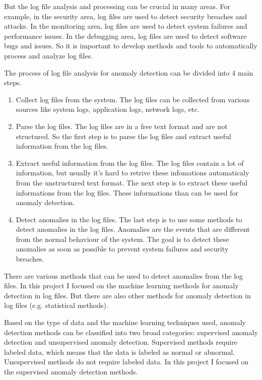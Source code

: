 But the log file analysis and processing can be crucial in many areas. For example, in the security area, log files are used to detect security breaches and attacks. 
In the monitoring area, log files are used to detect system failures and performance issues. In the debugging area, log files are used to detect software bugs and issues. %
So it is important to develop methods and tools to automatically process and analyze log files. 

The process of log file analysis for anomaly detection can be divided into 4 main steps.
\begin{enumerate}
    \item Collect log files from the system. The log files can be collected from various sources like system logs, application logs, network logs, etc. 
    \item Parse the log files. The log files are in a free text format and are not structured. So the first step is to parse the log files and extract useful information from the log files.
    \item Extract useful information from the log files. The log files contain a lot of information, but usually it's hard to retrive these infomations automaticaly from the unstructured text format. The next step is to extract these useful informations from the log files. These informations than can be used for anomaly detection.
    \item Detect anomalies in the log files. The last step is to use some methods to detect anomalies in the log files. Anomalies are the events that are different from the normal behaviour of the system. The goal is to detect these anomalies as soon as possible to prevent system failures and security breaches.
\end{enumerate}

There are various methods that can be used to detect anomalies from the log files. In this project I focused on the machine learning methods for anomaly detection in log files.
But there are also other methods for anomaly detection in log files (e.g. statistical methods). %

Based on the type of data and the machine learning techniques used, anomaly detection methods can be classified into two broad categories: supervised anomaly detection and unsupervised
anomaly detection. Supervised methods require labeled data, which means that the data is labeled as normal or abnormal. Unsupervised methods do not require labeled data. In this project I focused on 
the supervised anomaly detection methods.

